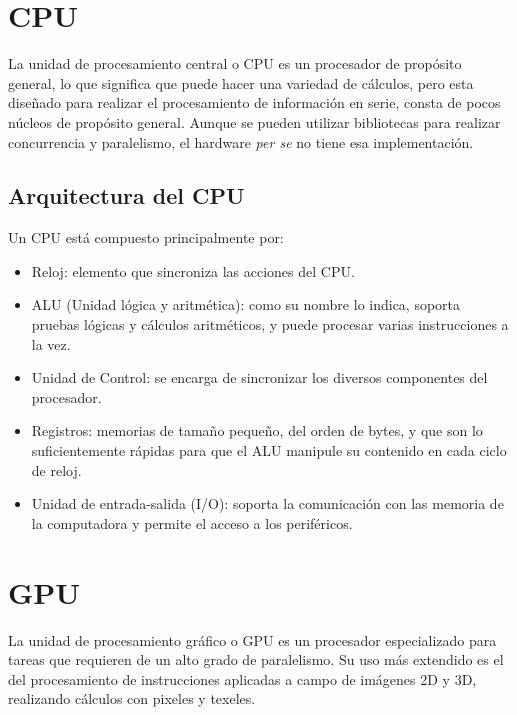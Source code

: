 
    \section{CPU}
    La unidad de procesamiento central o CPU es un procesador de propósito general, lo que significa que puede hacer una variedad de cálculos, pero esta diseñado para realizar el procesamiento de información en serie, consta de pocos núcleos de propósito general. Aunque se pueden utilizar bibliotecas para realizar concurrencia y paralelismo, el hardware \textit{per se} no tiene esa implementación.

     \subsection{Arquitectura del CPU}

Un CPU está compuesto principalmente por:
\begin{itemize}
\item Reloj: elemento que sincroniza las acciones del CPU.
\item ALU (Unidad lógica y aritmética): como su nombre lo indica, soporta pruebas lógicas y cálculos aritméticos, y puede procesar varias instrucciones a la vez.
\item Unidad de Control: se encarga de sincronizar los diversos componentes del procesador.
\item Registros: memorias de tamaño pequeño, del orden de bytes, y que son lo suficientemente rápidas para que el ALU manipule su contenido en cada ciclo de reloj.
\item Unidad de entrada-salida (I/O): soporta la comunicación con las memoria de la computadora y permite el acceso a los periféricos.
\end{itemize}   

    \section{GPU}
   
    La unidad de procesamiento gráfico o GPU es un procesador especializado para tareas que requieren de un alto grado de paralelismo. Su uso más extendido es el del procesamiento de instrucciones aplicadas a campo de imágenes 2D y 3D, realizando cálculos con pixeles y texeles\cite{TX2CU}.
    

